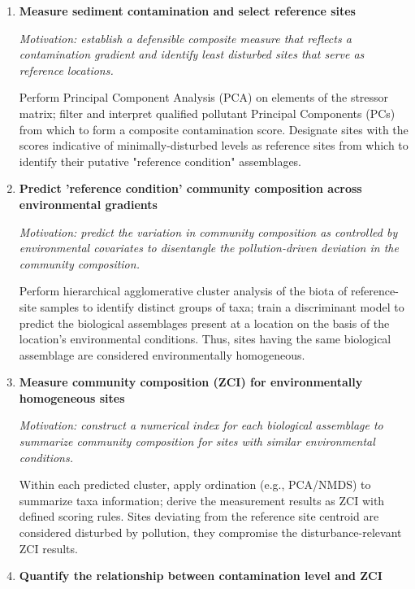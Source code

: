 \begin{enumerate}
    \item \textbf{Measure sediment contamination and select reference sites}
    
    \emph{Motivation: establish a defensible composite measure that reflects a contamination gradient and identify 
    least disturbed sites that serve as reference locations.}

    Perform Principal Component Analysis (PCA) on elements of the stressor matrix;
    filter and interpret qualified pollutant Principal Components (PCs) from which to form a
    composite contamination score. Designate sites with the scores indicative of minimally-disturbed
    levels as reference sites from which to identify their putative "reference condition" assemblages.

    \item \textbf{Predict 'reference condition' community composition across environmental gradients} 
    
    \emph{Motivation: predict the variation in community composition as controlled by environmental covariates
    to disentangle the pollution-driven deviation in the community composition.}

    Perform hierarchical agglomerative cluster analysis of the biota of reference-site samples to identify
    distinct groups of taxa; train a discriminant model to predict the biological assemblages present at 
    a location on the basis of the location’s environmental conditions. 
    Thus, sites having the same biological assemblage are considered environmentally homogeneous.

    \item \textbf{Measure community composition (ZCI) for environmentally homogeneous sites}

    \emph{Motivation: construct a numerical index for each biological assemblage to summarize
    community composition for sites with similar environmental conditions.}

    Within each predicted cluster, apply ordination (e.g., PCA/NMDS) to summarize taxa information;
    derive the measurement results as ZCI with defined scoring rules.
    Sites deviating from the reference site centroid are considered disturbed by pollution,
    they compromise the disturbance-relevant ZCI results.

    \item \textbf{Quantify the relationship between contamination level and ZCI}
    

\end{enumerate}
